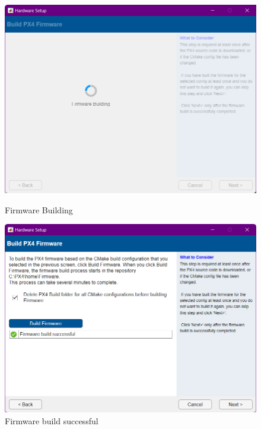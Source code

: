 \begin{figure}[htbp]
    \begin{minipage}[b]{0.5\linewidth} %
      \centering
      \includegraphics[width=\linewidth]{files/images/matlab14.png} %
      \caption{Firmware Building} %
      \label{fig:Firmware Building} %
    \end{minipage}%
    \begin{minipage}[b]{0.5\linewidth} %
        \centering
        \includegraphics[width=\linewidth]{files/images/matlab15.png} %
        \caption{Firmware build successful} %
      \label{fig:Firmware build successful} %
    \end{minipage}
\end{figure}
